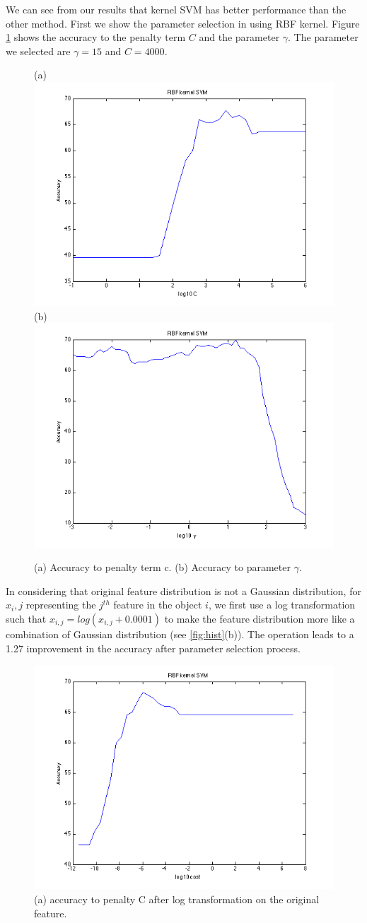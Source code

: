 \documentclass{article} %
\begin{document}
We can see from our results that kernel SVM has better performance than the other method. First we show the parameter selection in using RBF kernel. Figure \ref{fig:RBF} shows the accuracy to the penalty term $C$ and the parameter $\gamma$. The parameter we selected are $\gamma = 15$ and $C = 4000$.

\begin{figure}[ht!]
    \centering
    {(a)\includegraphics[width=0.45\linewidth]{../Figure/RBF_cost_accuracy.png}
    (b)\includegraphics[width=0.45\linewidth]{../Figure/RBF_gamma_accuracy.png}}
    \caption{(a) Accuracy to penalty term c. (b) Accuracy to parameter $\gamma$. }
    \label{fig:RBF}
\end{figure}

In considering that original feature distribution is not a Gaussian distribution, for $x_i,j$ representing the $j^{th}$ feature in the object $i$, we first use a log transformation such that $x_{i,j} = log(x_{i,j} + 0.0001)$ to make the feature distribution more like a combination of Gaussian distribution (see \ref{fig:hist}(b)). The operation leads to a 1.27 improvement in the accuracy after parameter selection process.


\begin{figure}[ht!]
    \centering
    \includegraphics[width=0.45\linewidth]{../Figure/RBF_cost_accuracy_log.png}
     \centering
    \caption{(a) accuracy to penalty C after log transformation on the original feature.}
\end{figure}
\end{document}
